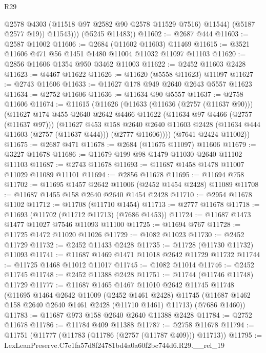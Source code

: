 \begin{lexlean}{R29}
\begin{coremodule}
                @2578
                @4303
                (@11518 @97 @2582 @90 @2578 @11529 @7516)
                @11544)
              (@5187 @2577 @19))
            @11543)))
      (@5245 @11483))
@11602 := @2687 @444
@11603 := @2587 @11002
@11606 := @2684 (@11602 @11603) @11469
@11615 := @3521 @11606 @471 @56 @1451 @1480 @11004 @11032 @11097 @11103
@11620 := @2856 @11606 @1354 @950 @3462 @11003
@11622 := @2452 @11603 @2428
@11623 := @4467 @11622
@11626 := @11620 (@5558 @11623) @11097
@11627 := @2743 @11606
@11633 := @11627 @178 @949 @2640 @2643 @5557 @11623
@11634 := @2752 @11606
@11636 := @11634 @90 @5557
@11637 := @2758 @11606
@11674 := @11615
    (@11626
      (@11633
        (@11636 (@2757 (@11637 @90)))
        (@11627
          @174
          @455
          @2640
          @2642
          @4466
          @11622
          (@11634 @97 @4466 (@2757 (@11637 @97)))
          (@11627
            @453
            @158
            @2640
            @2640
            @11603
            @2428
            (@11634 @444 @11603 (@2757 (@11637 @444)))
            (@2777 @11606))))
      (@7641 @2424 @11002))
@11675 := @2687 @471
@11678 := @2684 (@11675 @11097) @11606
@11679 := @3227 @11678
@11686 := @11679 @199 @98 @1479 @11030 @2640 @11102 @11103
@11687 := @2743 @11678
@11693 := @11687 @1458 @1478 @11007 @11029 @11089 @11101
@11694 := @2856 @11678
@11695 := @11694 @758
@11702 := @11695 @1457 @2642 @11006 (@2452 @1454 @2428) @11089
@11708 := @11687 @1455 @158 @2640 @2640 @1454 @2428
@11710 := @2954 @11678 @1102
@11712 := @11708 (@11710 @1454)
@11713 := @2777 @11678
@11718 := @11693 (@11702 (@11712 @11713) (@7686 @1453))
@11724 := @11687 @1473 @1477 @11027 @7546 @11093 @11100
@11725 := @11694 @767
@11728 := @11725 @1472 @11020 @11026
@11729 := @1082 @11023
@11730 := @2452 @11729
@11732 := @2452 @11433 @2428
@11735 := @11728 (@11730 @11732) @11093
@11741 := @11687 @1469 @1471 @11018 @2642 @11729 @11732
@11744 := @11725 @1468 @11012 @11017
@11745 := @1082 @11014
@11746 := @2452 @11745
@11748 := @2452 @11388 @2428
@11751 := @11744 (@11746 @11748) @11729
@11777 := @11687
    @1465
    @1467
    @11010
    @2642
    @11745
    @11748
    (@11695
      @1464
      @2642
      @11009
      (@2452 @1461 @2428)
      @11745
      (@11687 @1462 @158 @2640 @2640 @1461 @2428 (@11710 @1461) @11713)
      (@7686 @1460))
@11783 := @11687 @973 @158 @2640 @2640 @11388 @2428
@11784 := @2752 @11678
@11786 := @11784 @409 @11388
@11787 := @2758 @11678
@11794 := @11751 (@11777 (@11783 (@11786 (@2757 (@11787 @409))) @11713))
@11795 := LexLeanPreserve.C7e1fa57d8f24781bd4a0a60f2bc744d6.R29.__rel_19

\end{coremodule}
\end{lexlean}
